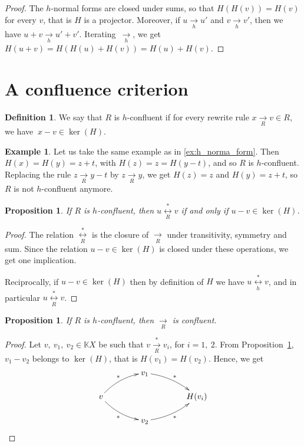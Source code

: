 \documentclass[10pt]{easychair}
\newtheorem{proposition}[theorem]{Proposition}
\theoremstyle{definition}
\newtheorem{definition}[theorem]{Definition}
\newtheorem{example}[theorem]{Example}
\newcommand\K{\mathbb{K}}
\newcommand\KX{\K X}
\newcommand\rewR{\underset{R}{\longrightarrow}}
\newcommand\rewh{\underset{h}{\longrightarrow}}
\newcommand\transR{\overset{*}{\rewR}}
\newcommand\equivR{\underset{R}{\overset{*}{\longleftrightarrow}}}
\newcommand\equivh{\underset{h}{\overset{*}{\longleftrightarrow}}}
\begin{document}
\begin{proof}
  The $h$-normal forms are closed under sums, so that $H(H(v))=H(v)$ for
  every $v$, that is $H$ is a projector. Moreover, if $u \rewh u'$ and
  $v \rewh v'$, then we have $u + v \rewh u' + v'$. Iterating~$\rewh$, we
  get $H(u + v) = H (H(u)+H(v))=H(u)+H(v)$. 
\end{proof}

\section{A confluence criterion}




\begin{definition}\label{def:standardisation_property}
  We say that $R$ is $h$-confluent if for every rewrite rule $x\rewR v\in R$, we have $\ x-v\in\ker(H)$.
\end{definition}

\begin{example}
Let us take the same example as in \ref{ex:h_norma_form}. Then $H(x) = H(y) = z + t$, with $H(z) = z = H(y - t)$, and so $R$ is $h$-confluent. Replacing the rule $z \rewR y - t$ by $z \rewR y$, we get $H(z) = z$ and $H(y) = z + t$, so $R$ is not $h$-confluent anymore. 
\end{example}

\begin{proposition}\label{prop:equationnal_theory}
  If $R$ is $h$-confluent, then
  $u \equivR v$ if and only if $u-v\in\ker(H)$.
\end{proposition}

\begin{proof}
The relation $\equivR$ is the closure of $\rewR$ under transitivity, symmetry and sum. Since the relation $u - v \in \ker(H)$ is closed under these operations, we get one implication.

Reciprocally, if $u - v \in \ker(H)$ then by definition of $H$ we have $u \equivh v$, and in particular $u \equivR v$.
\end{proof}

\begin{proposition}
If $R$ is $h$-confluent, then $\rewR$ is confluent.
\end{proposition}
\begin{proof}
  Let $v,\ v_1,\ v_2\in\KX$ be such that $v\transR v_i$, for $i=1,\ 2$.
  From Proposition~\ref{prop:equationnal_theory}, $v_1-v_2$ belongs to
  $\ker(H)$, that is $H(v_1)=H(v_2)$. Hence, we get
  \[
    \xymatrix @C = 4em @R = 1.5em{
      &
      v_1
      \ar@/^/ [rd] ^{*}
      & \\
      v
      \ar@/^/ [ru] ^{*}
      \ar@/_/ [rd] _{*}
      &
      &
      H(v_i)
      \\
      &
      v_2
      \ar@/_/  [ru] _{*}
      &
    }
  \]
  
\end{proof}
\end{document}
